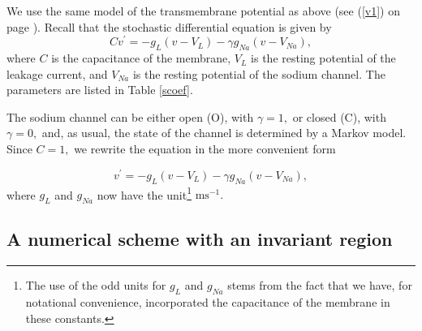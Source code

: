 We use the same model of the transmembrane potential as above (see
(\ref{v1}) on page \pageref{v1}). Recall that the stochastic differential equation is
given by
\begin{equation}
Cv^{\prime}=-g_{L}\left(  v-V_{L}\right)  -\gamma g_{Na}(v-V_{Na}), \label{sv1}
\end{equation}
where $C$ is the capacitance of the membrane, $V_{L}$ is the resting potential
of the leakage current, and $V_{Na}$ is the resting potential of the sodium
channel. The parameters are listed in Table \ref{scoef}.


The sodium channel can be either open (O), with $\gamma=1,$ or closed (C), with
$\gamma=0,$ and, as usual, the state of the channel is determined by a Markov
model. Since $C=1,$ we rewrite the equation in the more convenient form

\begin{equation}
v^{\prime}=-g_{L}\left(  v-V_{L}\right)  -\gamma g_{Na}(v-V_{Na}), \label{sv2}
\end{equation}
where $g_{L}$ and $g_{Na}$ now have the unit\footnote{The use of the odd units for 
$g_{L}$ and $g_{Na}$ stems from the fact that we have, for notational
 convenience, incorporated the capacitance of the membrane in these constants.}
$\text{ms}^{-1}.$

\subsection{A numerical scheme with an invariant region}

